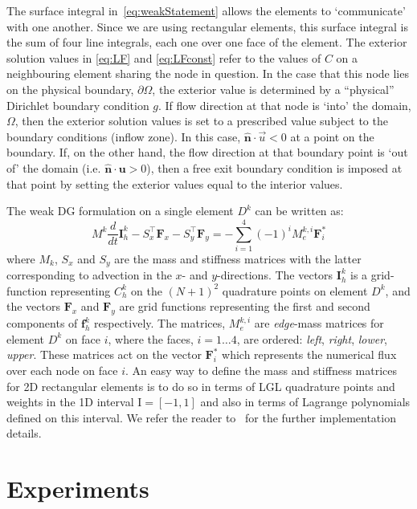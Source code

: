 \documentclass[onecolumn, 12pt, conference]{ieeeconf}
\renewcommand{\u}{\vec{u}}
\begin{document}
The surface integral in~\eqref{eq:weakStatement} allows the elements to `communicate' with one another. Since we are using rectangular elements, this surface integral is the sum of four line integrals, each one over one face of the element. The exterior solution values in \eqref{eq:LF} and \eqref{eq:LFconst} refer to the values of $C$ on a neighbouring element sharing the node in question. In the case that this node lies on the physical boundary, $\partial \Omega$, the exterior value is determined by a ``physical'' Dirichlet boundary condition $g$. If flow direction at that node is `into' the domain, $\Omega$, then the exterior solution values is set to a prescribed value subject to the boundary conditions (inflow zone). In this case, $\bm{\hat{n}}\cdot \u<0$ at a point on the boundary. If, on the other hand, the flow direction at that boundary point is `out of' the domain (i.e. $\bm{\hat{n}}\cdot \bm{u}>0$), then a free exit boundary condition is imposed at that point by setting the exterior values equal to the interior values.

The weak DG formulation on a single element $D^k$ can be written as:
\begin{equation}
\label{eq:weakDG}
M^k \dfrac{d}{dt} \bm{I}_h^k - S_x^\top \bm{F}_x - S_y^\top \bm{F}_y =-\sum\limits_{i=1}^4 (-1)^i M_e^{k,i} \bm{F}^*_i
\end{equation}
where $M_k$, $S_x$ and $S_y$ are the mass and stiffness matrices with the latter corresponding to advection in the $x$- and $y$-directions. The vectors $\bm{I}_h^k$ is a grid-function representing $C_h^k$ on the $(N+1)^2$ quadrature points on element $D^k$, and the vectors $\bm{F}_x$ and $\bm{F}_y$ are grid functions representing the first and second components of $\bm{f}_h^k$ respectively. The matrices, $M_e^{k,i}$ are \emph{edge}-mass matrices for element $D^k$ on face $i$, where the faces, $i= 1 \ldots 4$, are ordered: \emph{left}, \emph{right}, \emph{lower}, \emph{upper}. These matrices act on the vector $\bm{F}^*_i$ which represents the numerical flux over each node on face $i$. An easy way to define the mass and stiffness matrices for 2D rectangular elements is to do so in terms of LGL quadrature points and weights in the 1D interval $\mbox{I}=[-1,1]$ and also in terms of Lagrange polynomials defined on this interval. We refer the reader to~\cite{SZTT_SISC17} for the further implementation details.

\section{Experiments}
\label{sec:experiments}
\end{document}
